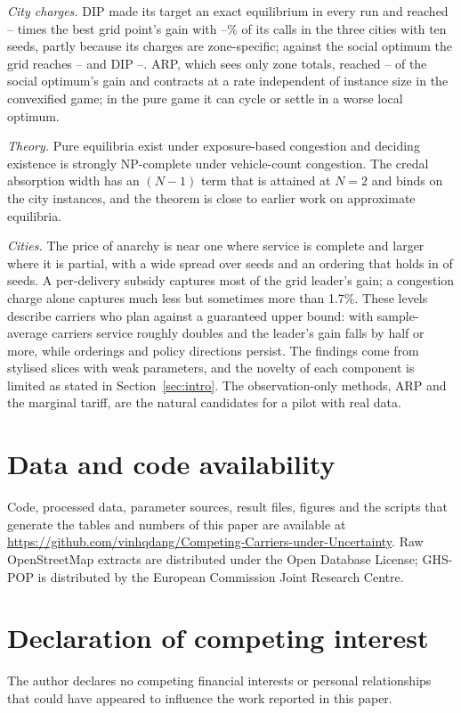 \documentclass[preprint,12pt]{elsarticle}
\theoremstyle{definition}
\theoremstyle{remark}
\begin{document}
\emph{City charges.} DIP made its target an exact equilibrium in every run and reached \TenDipGridBuenosAires--\TenDipGridNewDelhi{} times the best grid point's gain with \TenDipCallsNewDelhi--\TenDipCallsLondon\% of its calls in the three cities with ten seeds, partly because its charges are zone-specific; against the social optimum the grid reaches \TenSoGridNewDelhi--\TenSoGridBuenosAires{} and DIP \TenSoDipNewDelhi--\TenSoDipLondon. ARP, which sees only zone totals, reached \TenSoArpNewDelhi--\TenSoArpBuenosAires{} of the social optimum's gain and contracts at a rate independent of instance size in the convexified game; in the pure game it can cycle or settle in a worse local optimum.

\emph{Theory.} Pure equilibria exist under exposure-based congestion and deciding existence is strongly NP-complete under vehicle-count congestion. The credal absorption width has an $(N-1)$ term that is attained at $N=2$ and binds on the city instances, and the theorem is close to earlier work on approximate equilibria.

\emph{Cities.} The price of anarchy is near one where service is complete and larger where it is partial, with a wide spread over seeds and an ordering that holds in \TenPoaOrderAll{} of \TenPoaOrderN{} seeds. A per-delivery subsidy captures most of the grid leader's gain; a congestion charge alone captures much less but sometimes more than 1.7\%. These levels describe carriers who plan against a guaranteed upper bound: with sample-average carriers service roughly doubles and the leader's gain falls by half or more, while orderings and policy directions persist. The findings come from stylised slices with weak parameters, and the novelty of each component is limited as stated in Section~\ref{sec:intro}. The observation-only methods, ARP and the marginal tariff, are the natural candidates for a pilot with real data.

\section*{Data and code availability}
Code, processed data, parameter sources, result files, figures and the scripts that generate the tables and numbers of this paper are available at \url{https://github.com/vinhqdang/Competing-Carriers-under-Uncertainty}. Raw OpenStreetMap extracts are distributed under the Open Database License; GHS-POP is distributed by the European Commission Joint Research Centre.

\section*{Declaration of competing interest}
The author declares no competing financial interests or personal relationships that could have appeared to influence the work reported in this paper.
\end{document}
